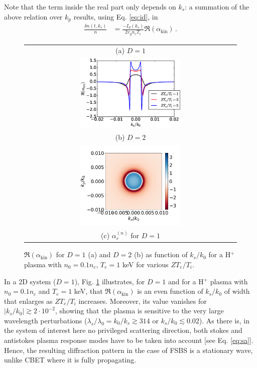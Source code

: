 \documentclass[
 reprint,
 amsmath,amssymb,
 aps,
]{revtex4-1}
\begin{document}
Note that the term inside the real part only depends on $k_s$:   a summation of the above relation over $k_p$ results, using Eq. \eqref{eq:id}, in  
\begin{align}
\frac{ \delta n (t,k_s ) }{n}  &=   \frac{ -I_d(k_s) }{ 2 v_g n_c T_e } 
 \Re \left( \alpha_\mathrm{kin}   \right)  \, .\label{eq:drakef}
\end{align}

\begin{figure}
\begin{tabular}{c}
(a) $D=1$\\
\includegraphics[width=0.49\textwidth]{akin.eps}\\
(b) $D=2$\\
\includegraphics[width=0.49\textwidth]{real_F_kin_3d_vd0cs_te1keV_Ti300eV_H+.png}\\
(c) $\alpha_r^{(n)}$ for  $D=1$\\
\end{tabular}
\caption{ \label{fig:akin}  
 $\Re \left( \alpha_\mathrm{kin}   \right)$ for $D=1$ (a) and $D=2$ (b) as function of $k_s/k_0$ for a H$^{+}$ plasma with $n_0=0.1n_c$, $T_e =1$ keV for various $ZT_e/T_i$. 
 }
\end{figure}
In a 2D system ($D=1$), Fig. \ref{fig:akin} illustrates, for $D=1$ and for  a H$^{+}$ plasma with $n_0=0.1n_c$ and  $T_e =1$ keV, that $\Re \left( \alpha_\mathrm{kin}   \right)$ is an even function  of $k_s/k_0$ of width that enlarges as  $ZT_e/T_i$ increases. Moreover, its value vanishes for $\vert k_s/k_0 \vert  \gtrsim 2 \cdot 10^{-2}$, showing that the plasma is sensitive  to the very large wavelength perturbations ($\lambda_s/\lambda_0=k_0/k_s\gtrsim 314 $ or $k_s/k_0\lesssim 0.02$). As there is, in  the system of interest here no privileged scattering direction, both stokes and antistokes plasma response modes have to be taken into account [see Eq. \eqref{eq:sa}]. Hence,  the resulting diffraction pattern  in the case of FSBS is  a stationary  wave, unlike CBET where it is fully propagating.
\end{document}
